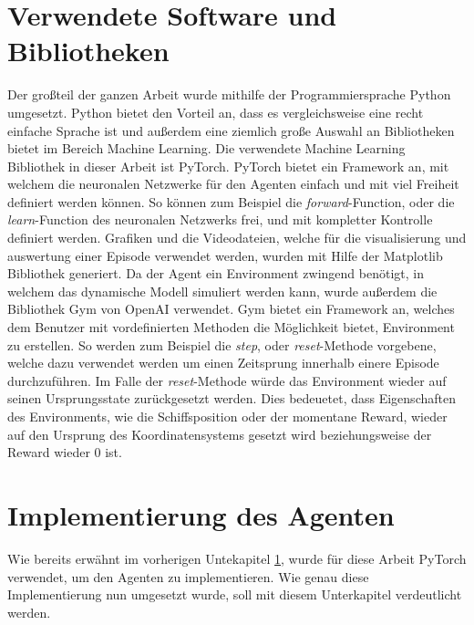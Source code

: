 \documentclass[]{iat}
\begin{document}
\section{Verwendete Software und Bibliotheken} \label{sec:software_bibs}
Der großteil der ganzen Arbeit wurde mithilfe der Programmiersprache Python umgesetzt. Python bietet den Vorteil an, dass es vergleichsweise eine recht einfache Sprache ist und außerdem eine ziemlich große Auswahl an Bibliotheken bietet im Bereich Machine Learning. Die verwendete Machine Learning Bibliothek in dieser Arbeit ist PyTorch. PyTorch bietet ein Framework an, mit welchem die neuronalen Netzwerke für den Agenten einfach und mit viel Freiheit definiert werden können. So können zum Beispiel die \textit{forward}-Function, oder die \textit{learn}-Function des neuronalen Netzwerks frei, und mit kompletter Kontrolle definiert werden. Grafiken und die Videodateien, welche für die visualisierung und auswertung einer Episode verwendet werden, wurden mit Hilfe der Matplotlib Bibliothek generiert. Da der Agent ein Environment zwingend benötigt, in welchem das dynamische Modell simuliert werden kann, wurde außerdem die Bibliothek Gym von OpenAI verwendet. Gym bietet ein Framework an, welches dem Benutzer mit vordefinierten Methoden die Möglichkeit bietet, Environment zu erstellen. So werden zum Beispiel die \textit{step}, oder \textit{reset}-Methode vorgebene, welche dazu verwendet werden um einen Zeitsprung innerhalb einere Episode durchzuführen. Im Falle der \textit{reset}-Methode würde das Environment wieder auf seinen Ursprungsstate zurückgesetzt werden. Dies bedeuetet, dass Eigenschaften des Environments, wie die Schiffsposition oder der momentane Reward, wieder auf den Ursprung des Koordinatensystems gesetzt wird beziehungsweise der Reward wieder 0 ist.
\section{Implementierung des Agenten} \label{sec:imp_agent}
Wie bereits erwähnt im vorherigen Untekapitel \ref{sec:software_bibs}, wurde für diese Arbeit PyTorch verwendet, um den Agenten zu implementieren. Wie genau diese Implementierung nun umgesetzt wurde, soll mit diesem Unterkapitel verdeutlicht werden.
\end{document}
